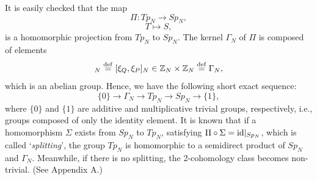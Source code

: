 \documentclass[12pt]{iopart}
\newcommand{\deq}{\stackrel{\rm{\tiny def}}{=}}
\begin{document}
It is easily checked that the map
\begin{equation}
\Pi:Tp_N\longrightarrow Sp_N,
\end{equation}
\begin{equation}
T\mapsto S,
\end{equation}
is a homomorphic projection from \(Tp_N\) to \(Sp_N\).
The kernel \(\Gamma_N\) of \(\Pi\) is composed of elements
\begin{equation}
[\xi]_N\deq[\xi_Q,\xi_P]_N\in\mathbb Z_N\times\mathbb Z_N\deq\Gamma_N,
\end{equation}
%
which is an abelian group.
%
Hence, we have the following short exact sequence:
\begin{equation}
\{0\}\longrightarrow\Gamma_N\longrightarrow Tp_N\longrightarrow Sp_N\longrightarrow\{1\},
\label{short-exact-sequence-tpn}
\end{equation}
where \(\{0\}\) and \(\{1\}\) are additive and multiplicative trivial groups, respectively, i.e., groups composed of only the identity element.
%
It is known that if a homomorphism \(\Sigma\) exists from \(Sp_N\) to \(Tp_N\), satisfying
\(\Pi\circ\Sigma={\rm id}|_{Sp_N}\), which is called  `{\it splitting}',
the group \(Tp_N\) is homomorphic to a semidirect product of \(Sp_N\) and \(\Gamma_N\).
Meanwhile, if there is no splitting, the 2-cohomology class becomes non-trivial.
(See Appendix A.)
\end{document}
